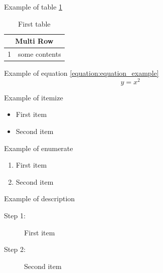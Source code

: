 Example of table \ref{table:table_example}
\begin{table}[h]
    \caption{First table}
    \label{table:table_example}
    \centering
    \begin{tabular}{|l|l|}
      \hline
      \multicolumn{2}{|c|}{Multi Row}\\
      \hline
      1 &  some contents\\
      \hline
    \end{tabular}
\end{table}

Example of equation \ref{equation:equation_example}
\begin{equation}
    y=x^2
    \label{equation:equation_example}
\end{equation}

Example of itemize
\begin{itemize}
    \item First item
    \item Second item
\end{itemize}

Example of enumerate
\begin{enumerate}
    \item First item
    \item Second item
\end{enumerate}

Example of description
\begin{description}
    \item[Step 1:] First item
    \item[Step 2:] Second item
\end{description}
